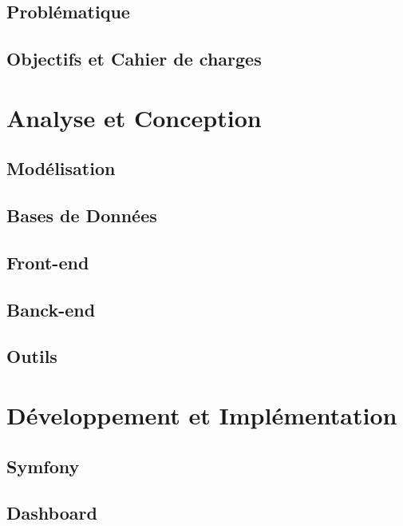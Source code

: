 \documentclass[12pt]{article}
\begin{document}
\subsection{Problématique}

\subsection{Objectifs et Cahier de charges}

\newpage

\section{Analyse et Conception}

\subsection{Modélisation}

\subsection{Bases de Données}

\subsection{Front-end}

\subsection{Banck-end}

\subsection{Outils}

\newpage

\section{Développement et Implémentation}

\subsection{Symfony}

\subsection{Dashboard}
\end{document}
